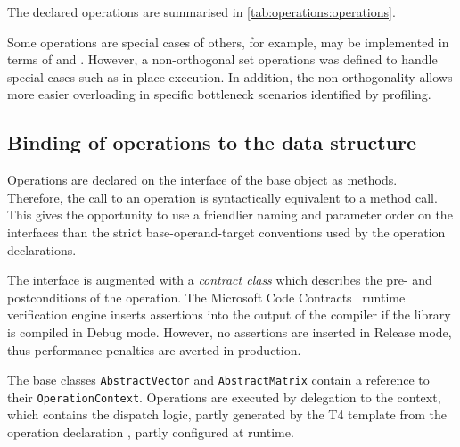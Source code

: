 The declared operations are summarised in
\cref{tab:operations:operations}.

Some operations are special cases of others, for example,
 may be implemented in terms of
 and
. However, a
non-orthogonal set operations was defined to handle special cases such
as in-place execution. In addition, the non-orthogonality allows
more easier overloading in specific bottleneck scenarios identified by
profiling.

\subsection{Binding of operations to the data structure}

Operations are declared on the interface of the base object as
methods. Therefore, the call to an operation is syntactically
equivalent to a method call. This gives the opportunity to use a
friendlier naming and parameter order on the interfaces than the
strict base-operand-target conventions used by the operation
declarations.

The interface is augmented with a \emph{contract class} which
describes the pre- and postconditions of the operation. The Microsoft
Code Contracts~\citep{CodeContracts} runtime verification engine
inserts assertions into the output of the compiler if the library is
compiled in Debug mode. However, no assertions are inserted in Release
mode, thus performance penalties are averted in production.

The base classes \texttt{AbstractVector} and \texttt{AbstractMatrix}
contain a reference to their \texttt{OperationContext}. Operations are
executed by delegation to the context, which contains the dispatch
logic, partly generated by the T4 template from the operation
declaration , partly configured at runtime.

